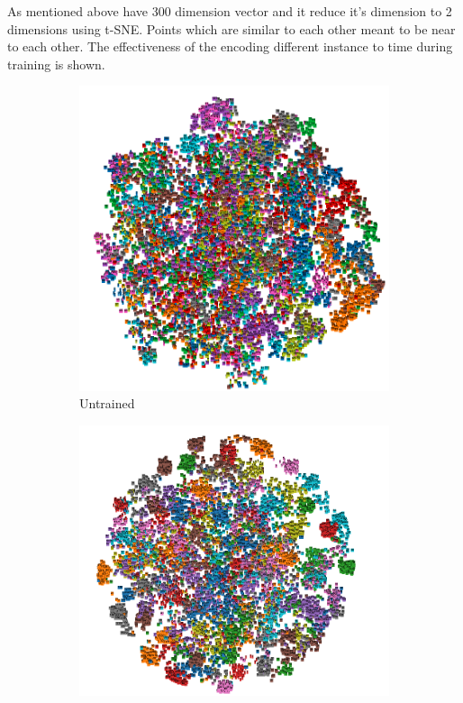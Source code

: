 As mentioned above have 300 dimension vector and it reduce it's dimension to 2 dimensions using t-SNE\cite{}. Points which are similar to each other meant to be near to each other. The effectiveness of the encoding different instance to time during training is shown.

\begin{figure}[h]
\begin{subfigure}[b]{0.3\textwidth}
  \includegraphics[width=\textwidth]{figures/untrained.png}  
  \caption{Untrained}
  \label{fig:0e}
\end{subfigure}
\hfill
\begin{subfigure}[b]{0.3\textwidth}
  \includegraphics[width=\textwidth]{figures/5e_tsne.png}  

\end{subfigure}
\end{figure}
